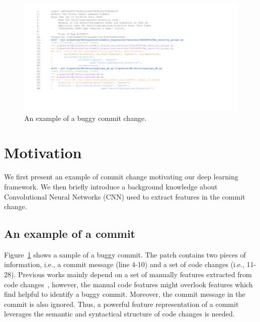 \begin{figure}
\center
\includegraphics[scale=0.27]{figs/example.pdf}
\caption{An example of a buggy commit change.}
\label{fig:example}
\end{figure} 

\section{Motivation}
\label{sec:motivation}


We first present an example of commit change motivating our deep learning framework. We then briefly introduce a background knowledge about Convolutional Neural Networks (CNN) used to extract features in the commit change. 

\subsection{An example of a commit}
\label{sec:examle}
Figure~\ref{fig:example} shows a sample of a buggy commit. The patch contains two pieces of information, i.e., a commit message (line 4-10) and a set of code changes (i.e., 11-28). Previous works mainly depend on a set of manually features extracted from code changes~\cite{Yang:2015:DLJ, mcintosh2018fix}, however, the manual code features might overlook features which find helpful to identify a buggy commit. Moreover, the commit message in the commit is also ignored. Thus, a powerful feature representation of a commit leverages the semantic and syntactical structure of code changes is needed. 

